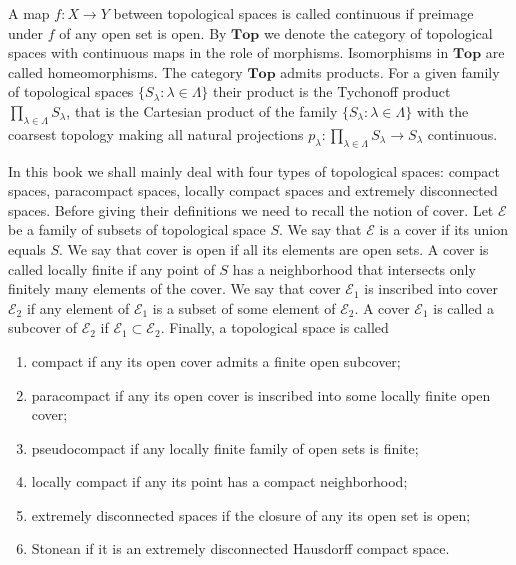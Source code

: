 A map $f:X\to Y$ between topological spaces is called continuous if preimage
under $f$ of any open set is open. By $\mathbf{Top}$ we denote the category of
topological spaces with continuous maps in the role of morphisms. Isomorphisms
in $\mathbf{Top}$ are called homeomorphisms. The category $\mathbf{Top}$ admits
products. For a given family of topological spaces $
\{S_\lambda:\lambda\in\Lambda \}$ their product is the Tychonoff product
$\prod_{\lambda\in\Lambda}S_\lambda$, that is the Cartesian product of the
family $ \{S_\lambda:\lambda\in\Lambda \}$ with the coarsest topology making all
natural projections $p_\lambda:\prod_{\lambda\in\Lambda}S_\lambda\to S_\lambda$
continuous.

In this book we shall mainly deal with four types of topological spaces: compact
spaces, paracompact spaces, locally compact spaces and extremely disconnected
spaces. Before giving their definitions we need to recall the notion of cover.
Let $\mathcal{E}$ be a family of subsets of topological space $S$. We say that
$\mathcal{E}$ is a cover if its union equals $S$. We say that cover is open if
all its elements are open sets. A cover is called locally finite if any point of
$S$ has a neighborhood that intersects only finitely many elements of the cover.
We say that cover $\mathcal{E}_1$ is inscribed into cover $\mathcal{E}_2$ if any
element of $\mathcal{E}_1$ is a subset of some element of $\mathcal{E}_2$. A
cover $\mathcal{E}_1$ is called a subcover of $\mathcal{E}_2$ if
$\mathcal{E}_1\subset\mathcal{E}_2$. Finally, a topological space is called 
\begin{enumerate}[label = (\roman*)]
  \item compact if any its open cover admits a finite open subcover; 

  \item paracompact if any its open cover is inscribed into some locally finite
  open cover;
  
  \item pseudocompact if any locally finite family of open sets is finite;

  \item locally compact if any its point has a compact neighborhood;

  \item extremely disconnected spaces if the closure of any its open set is
  open;

  \item Stonean if it is an extremely disconnected Hausdorff compact space.
\end{enumerate}

